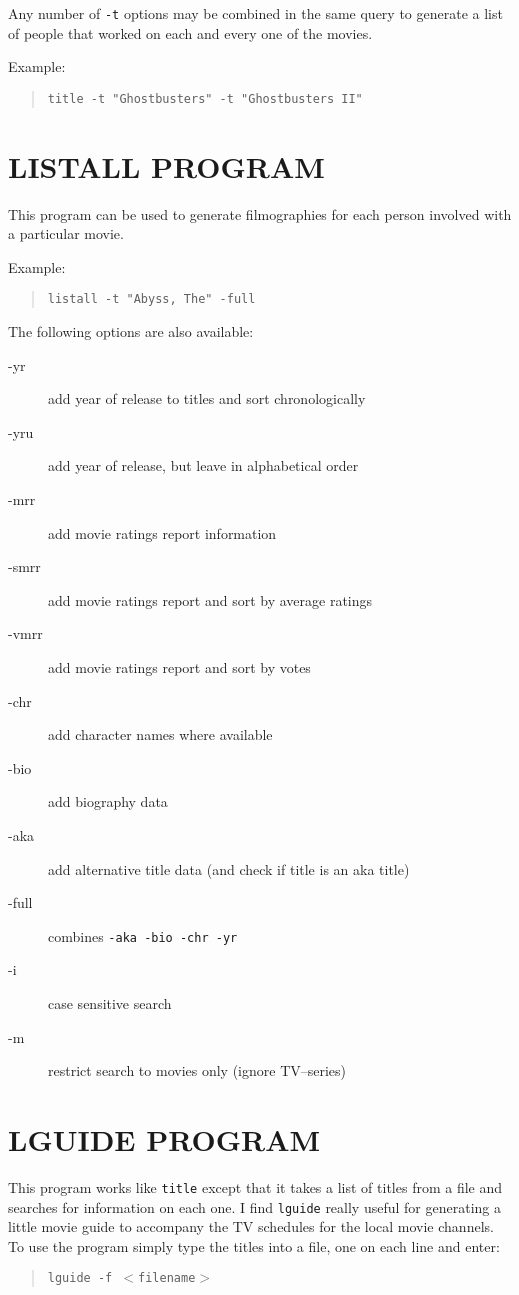 Any number of {\tt -t} options may be combined in the same query to 
generate 
a list of people that worked on each and every one of the movies.

Example:
\begin{quote}
{\tt title -t "Ghostbusters" -t "Ghostbusters II"}
\end{quote}

\clearpage
\section{LISTALL PROGRAM}

This program can be used to generate filmographies for each person involved
with a particular movie.

Example:
\begin{quote}
{\tt listall -t "Abyss, The" -full}
\end{quote}

The following options are also available:
\begin{description}
\item[-yr]   add year of release to titles and sort chronologically
\item[-yru]  add year of release, but leave in alphabetical order
\item[-mrr]  add movie ratings report information
\item[-smrr] add movie ratings report and sort by average ratings
\item[-vmrr] add movie ratings report and sort by votes
\item[-chr]  add character names where available
\item[-bio]  add biography data
\item[-aka]  add alternative title data (and check if title is an aka 
title)
\item[-full] combines {\tt -aka -bio -chr -yr}
\item[-i] case sensitive search
\item[-m]    restrict search to movies only (ignore TV--series)
\end{description}

\clearpage
\section{LGUIDE PROGRAM}

This program works like {\tt title} except that it takes a list of titles 
from a 
file and searches for information on each one. I find {\tt lguide} really 
useful for generating a little movie guide to accompany the TV schedules 
for the local movie channels. To use the program simply type the titles 
into a file, one on each line and enter:
\begin{quote}
{\tt lguide -f $<$filename$>$}
\end{quote}

